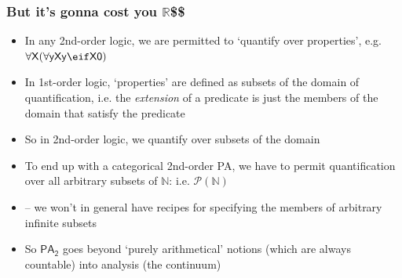 \begin{frame}
\frametitle{But it's gonna cost you $\mathbb{R}$\$\$}

\begin{itemize}[<+->]

\item In any 2nd-order logic, we are permitted to `quantify over properties', e.g. $\mathsf{\forall X (\forall y X y \eif X 0)}$

\item In 1st-order logic, `properties' are defined as subsets of the domain of quantification, i.e. the \textit{extension} of a predicate is just the members of the domain that satisfy the predicate 

\item So in 2nd-order logic, we quantify over subsets of the domain

\item To end up with a categorical 2nd-order PA, we have to permit quantification over all arbitrary subsets of  $\mathbb{N}$: i.e. $\mathcal{P}(\mathbb{N})$
\item[] -- we won't in general have recipes for specifying the members of arbitrary infinite subsets


\item So $\mathsf{PA_2}$ goes beyond `purely arithmetical' notions (which are always countable) into analysis (the continuum)


\end{itemize}
\end{frame}

